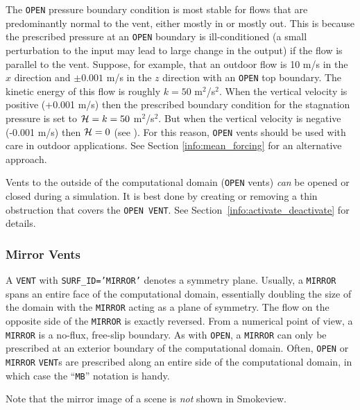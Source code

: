 \documentclass[11pt]{book}
\newcommand{\ct}{\tt\small}
\begin{document}
The {\ct OPEN} pressure boundary condition is most stable for flows that are predominantly normal  to the vent, either mostly in or mostly out.  This is because the prescribed pressure at an {\ct OPEN} boundary is ill-conditioned (a small perturbation to the input may lead to large change in the output) if the flow is parallel to the vent.  Suppose, for example, that an outdoor flow is 10 m/s in the $x$ direction and $\pm 0.001$ m/s in the $z$ direction with an {\ct OPEN} top boundary.  The kinetic energy of this flow is roughly $k=50$ m$^2$/s$^2$.  When the vertical velocity is positive (+0.001 m/s) then the prescribed boundary condition for the stagnation pressure is set to ${\cal H} = k = 50$ m$^2$/s$^2$.  But when the vertical velocity is negative (-0.001 m/s) then ${\cal H} = 0$ (see \cite{FDS_Tech_Guide}).  For this reason, {\ct OPEN} vents should be used with care in outdoor applications.  See Section \ref{info:mean_forcing} for an alternative approach.

\begin{warning}
Vents to the outside of the computational domain ({\ct OPEN} vents)
{\em  can} be opened or closed during a simulation. It is best done by creating or removing a thin obstruction that covers the {\ct OPEN VENT}.
See Section~\ref{info:activate_deactivate} for details.
\end{warning}

\subsubsection{Mirror Vents}

A {\ct VENT} with {\ct SURF\_ID='MIRROR'} denotes a symmetry plane. Usually, a {\ct MIRROR} spans an entire face of the computational
domain, essentially doubling the size of the domain with the {\ct MIRROR} acting as a plane of symmetry. The flow on the opposite side of the
{\ct MIRROR} is exactly reversed. From a numerical point of view, a {\ct MIRROR} is a no-flux, free-slip boundary. As with {\ct OPEN}, a {\ct MIRROR} can only be prescribed at an exterior boundary of the computational domain. Often, {\ct OPEN} or {\ct MIRROR} {\ct VENT}s are prescribed along an
entire side of the computational domain, in which case the ``{\ct MB}'' notation is handy.

\begin{warning}
\noindent
Note that the mirror image of a scene is {\em not} shown in Smokeview.
\end{warning}
\end{document}
